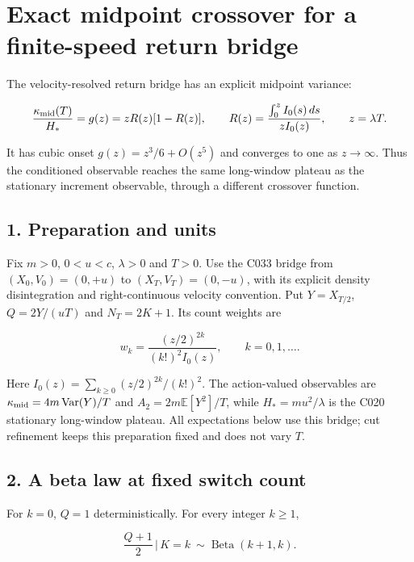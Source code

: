 \documentclass[11pt,a4paper]{article}
\begin{document}
\hypertarget{exact-midpoint-crossover-for-a-finite-speed-return-bridge}{%
\section{Exact midpoint crossover for a finite-speed return
bridge}\label{exact-midpoint-crossover-for-a-finite-speed-return-bridge}}

The velocity-resolved return bridge has an explicit midpoint variance:

\[\frac{\kappa_{\rm mid}(T)}{H_*}=g(z)=zR(z)[1-R(z)],\qquad
R(z)=\frac{\int_0^z I_0(s)\,ds}{zI_0(z)},\qquad z=\lambda T.\]

It has cubic onset \(g(z)=z^3/6+O(z^5)\) and converges to one as
\(z\to\infty\). Thus the conditioned observable reaches the same
long-window plateau as the stationary increment observable, through a
different crossover function.

\hypertarget{preparation-and-units}{%
\subsection{1. Preparation and units}\label{preparation-and-units}}

Fix \(m>0\), \(0<u<c\), \(\lambda>0\) and \(T>0\). Use the C033 bridge
from \((X_0,V_0)=(0,+u)\) to \((X_T,V_T)=(0,-u)\), with its explicit
density disintegration and right-continuous velocity convention. Put
\(Y=X_{T/2}\), \(Q=2Y/(uT)\) and \(N_T=2K+1\). Its count weights are

\[w_k=\frac{(z/2)^{2k}}{(k!)^2I_0(z)},\qquad k=0,1,\ldots.\]

Here \(I_0(z)=\sum_{k\ge0}(z/2)^{2k}/(k!)^2\). The action-valued
observables are \(\kappa_{\rm mid}=4m\operatorname{Var}(Y)/T\) and
\(A_2=2m\mathbb E[Y^2]/T\), while \(H_*=mu^2/\lambda\) is the C020
stationary long-window plateau. All expectations below use this bridge;
cut refinement keeps this preparation fixed and does not vary \(T\).

\hypertarget{a-beta-law-at-fixed-switch-count}{%
\subsection{2. A beta law at fixed switch
count}\label{a-beta-law-at-fixed-switch-count}}

For \(k=0\), \(Q=1\) deterministically. For every integer \(k\ge1\),

\[\boxed{\frac{Q+1}{2}\,\bigg|\,K=k\ \sim\operatorname{Beta}(k+1,k).}\]
\end{document}
